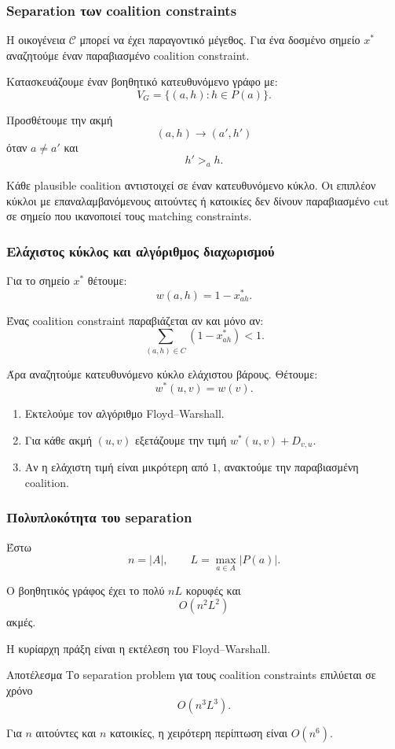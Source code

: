 \documentclass{beamer}
\begin{document}
	\begin{frame}
		\frametitle{Separation των coalition constraints}
		
		Η οικογένεια $\mathcal C$ μπορεί να έχει παραγοντικό μέγεθος. Για ένα δοσμένο σημείο $x^*$ αναζητούμε έναν παραβιασμένο coalition constraint.
		
		Κατασκευάζουμε έναν βοηθητικό κατευθυνόμενο γράφο με:
		\[
		V_G=\{(a,h):h\in P(a)\}.
		\]
		
		Προσθέτουμε την ακμή
		\[
		(a,h)\longrightarrow(a',h')
		\]
		όταν $a\neq a'$ και
		\[
		h'>_a h.
		\]
		
		Κάθε plausible coalition αντιστοιχεί σε έναν κατευθυνόμενο κύκλο. Οι επιπλέον κύκλοι με επαναλαμβανόμενους αιτούντες ή κατοικίες δεν δίνουν παραβιασμένο cut σε σημείο που ικανοποιεί τους matching constraints.
	\end{frame}
	
	\begin{frame}
		\frametitle{Ελάχιστος κύκλος και αλγόριθμος διαχωρισμού}
		
		Για το σημείο $x^*$ θέτουμε:
		\[
		w(a,h)=1-x^*_{ah}.
		\]
		
		Ένας coalition constraint παραβιάζεται αν και μόνο αν:
		\[
		\sum_{(a,h)\in C}(1-x^*_{ah})<1.
		\]
		
		Άρα αναζητούμε κατευθυνόμενο κύκλο ελάχιστου βάρους. Θέτουμε:
		\[
		w^*(u,v)=w(v).
		\]
		
		\begin{enumerate}
			\item Εκτελούμε τον αλγόριθμο Floyd--Warshall.
			\item Για κάθε ακμή $(u,v)$ εξετάζουμε την τιμή $w^*(u,v)+D_{v,u}$.
			\item Αν η ελάχιστη τιμή είναι μικρότερη από $1$, ανακτούμε την παραβιασμένη coalition.
		\end{enumerate}
	\end{frame}
	
	\begin{frame}
		\frametitle{Πολυπλοκότητα του separation}
		
		Έστω
		\[
		n=|A|,
		\qquad
		L=\max_{a\in A}|P(a)|.
		\]
		
		Ο βοηθητικός γράφος έχει το πολύ $nL$ κορυφές και
		\[
		O(n^2L^2)
		\]
		ακμές.
		
		Η κυρίαρχη πράξη είναι η εκτέλεση του Floyd--Warshall.
		
		\begin{block}{Αποτέλεσμα}
			Το separation problem για τους coalition constraints επιλύεται σε χρόνο
			\[
			O(n^3L^3).
			\]
		\end{block}
		
		Για $n$ αιτούντες και $n$ κατοικίες, η χειρότερη περίπτωση είναι $O(n^6)$.
	\end{frame}
	
\end{document}
